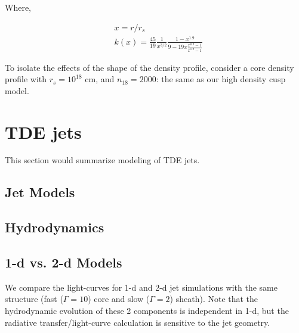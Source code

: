 \documentclass[usenatbib,fleqn]{mn2e}
\newcommand{\Mbh}[1][]{M_{\bullet#1}}
\begin{document}
Where, 

\begin{align}
  &x=r/r_s\\\nonumber
  &k(x)=\frac{45}{19} \frac{1}{x^{3/2}} \frac{1-x^{1.9}}{9-19
      x\frac{x^{0.9}-1}{x^{1.9}-1}}
\end{align}

To isolate the effects of the shape of the density profile, consider a
core density profile with $r_s=10^{18}$ cm, and $n_{18}=2000$: the
same as our high density cusp model.



\section{TDE jets}
\label{sec:jet}
This section would summarize modeling of TDE jets.

\subsection{Jet Models}

\subsection{Hydrodynamics}

\subsection{1-d vs. 2-d Models}
\label{sec:2d}
We compare the light-curves for 1-d and 2-d jet simulations with the
same structure (fast ($\Gamma=10$) core and slow ($\Gamma=2$)
sheath). Note that the hydrodynamic evolution of these 2 components is
independent in 1-d, but the radiative transfer/light-curve calculation
is sensitive to the jet geometry.
\end{document}
